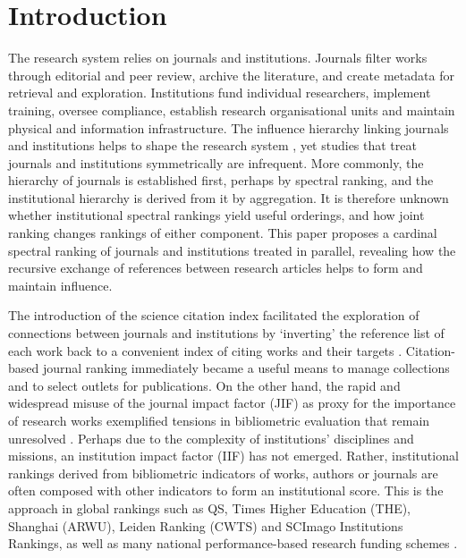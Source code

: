 \section{Introduction}
\label{sec:introduction}

The research system relies on journals and institutions. Journals filter
works through editorial and peer review, archive the literature, and
create metadata for retrieval and exploration. Institutions fund individual researchers,
implement training, oversee compliance, establish research organisational units
and maintain physical and information infrastructure. The influence hierarchy linking journals and institutions helps to shape the research system \citep{mertonSociologyScienceTheoretical1973, mcnameeStratificationScienceComparison1994, martinTiedKnowledgePower1998}, yet studies that treat journals and institutions symmetrically are infrequent. More commonly, the hierarchy of journals is established first, perhaps by spectral ranking, and the institutional hierarchy is derived from it by aggregation. It is therefore unknown whether institutional spectral rankings yield useful orderings, and how joint ranking changes rankings of either component. This paper proposes a cardinal spectral ranking of journals and institutions treated in parallel, revealing how the recursive exchange of references between research articles helps to form and maintain influence. 

The introduction of the science citation index \citep{garfieldScienceCitationIndex1964} facilitated the exploration of connections between journals and institutions by `inverting' the reference list of each work back to a convenient index of citing works and their targets \citep{woutersCitationCulture1999}. Citation-based journal ranking immediately became a useful means to manage collections and to select outlets for publications. On the other hand, the rapid and widespread misuse of the journal impact factor (JIF) as proxy for the importance of research works exemplified tensions in bibliometric evaluation that remain unresolved \citep{garfieldCitationAnalysisLegitimate1979,bornmannCitationCountsResearch2008, leydesdorffCitationsIndicatorsQuality2016, macrobertsMismeasureScienceCitation2018}. Perhaps due to the complexity of institutions' disciplines and missions, an institution impact factor (IIF) has not emerged. Rather, institutional rankings derived from bibliometric indicators of works, authors or journals are often composed with other indicators to form an institutional score. This is the approach in global rankings such as QS, Times Higher Education (THE), Shanghai (ARWU), Leiden Ranking (CWTS) and SCImago Institutions Rankings, as well as many national performance-based research funding schemes \citep{zacharewiczPerformancebasedResearchFunding2019}. 

